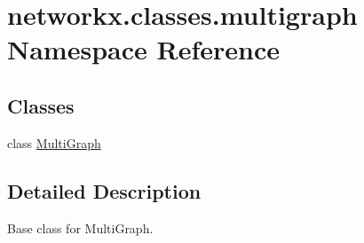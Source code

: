 \hypertarget{namespacenetworkx_1_1classes_1_1multigraph}{}\section{networkx.\+classes.\+multigraph Namespace Reference}
\label{namespacenetworkx_1_1classes_1_1multigraph}
\subsection*{Classes}
\begin{DoxyCompactItemize}
\item 
class \hyperlink{classnetworkx_1_1classes_1_1multigraph_1_1MultiGraph}{Multi\+Graph}
\end{DoxyCompactItemize}


\subsection{Detailed Description}
\begin{DoxyVerb}Base class for MultiGraph.\end{DoxyVerb}
 